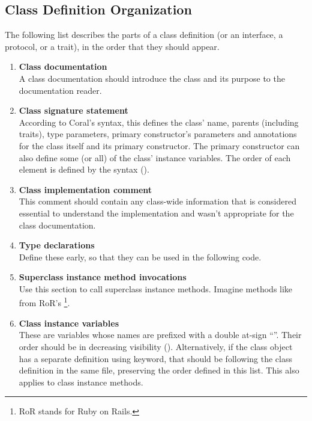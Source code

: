 \subsection{Class Definition Organization}

The following list describes the parts of a class definition (or an interface, a protocol, or a trait), in the order that they should appear. 

\begin{enumerate}
\item {\bfseries Class documentation} \hfill \\
A class documentation should introduce the class and its purpose to the documentation reader. 

\item {\bfseries Class signature statement} \hfill \\
According to Coral's syntax, this defines the class' name, parents (including traits), type parameters, primary constructor's parameters and annotations for the class itself and its primary constructor. The primary constructor can also define some (or all) of the class' instance variables. The order of each element is defined by the syntax (). 

\item {\bfseries Class implementation comment} \hfill \\
This comment should contain any class-wide information that is considered essential to understand the implementation and wasn't appropriate for the class documentation. 

\item {\bfseries Type declarations} \hfill \\
Define these early, so that they can be used in the following code. 

\item {\bfseries Superclass instance method invocations} \hfill \\
Use this section to call superclass instance methods. Imagine methods like  from RoR's \footnote{RoR stands for Ruby on Rails.}. 

\item {\bfseries Class instance variables} \hfill \\
These are variables whose names are prefixed with a double at-sign ``''. Their order should be in decreasing visibility (). Alternatively, if the class object has a separate definition using  keyword, that should be following the class definition in the same file, preserving the order defined in this list. This also applies to class instance methods. 


\end{enumerate}
